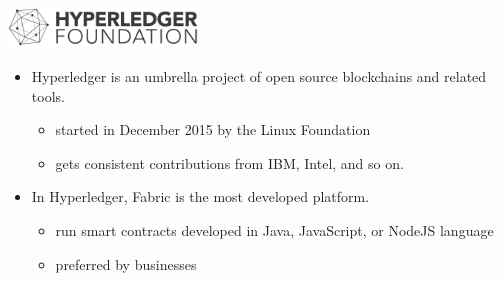 \documentclass[xcolor=svgnames]{beamer}
\begin{document}
\begin{frame}
\frametitle{
\includegraphics[height=1cm]{hyperledgerfoundation_horizontal-dark.png}
\qquad
{}
}

\begin{itemize}
\item Hyperledger is an umbrella project of open source blockchains and related tools.
\begin{itemize}
\item started in December 2015 by the Linux Foundation
\item gets consistent contributions from IBM, Intel, and so on.
\end{itemize}

\item<2-> In Hyperledger, Fabric is the most developed platform.
\begin{itemize}
\item run smart contracts developed in Java, JavaScript, or NodeJS language
\item preferred by businesses
\end{itemize}
\end{itemize}
\end{frame}
\end{document}
